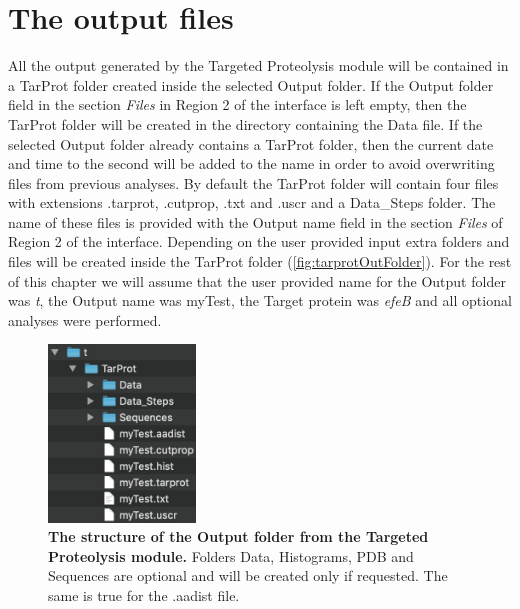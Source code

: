 \section{The output files}

All the output generated by the Targeted Proteolysis module will be contained in a TarProt folder created inside the selected Output folder. If the Output folder field in the section \textit{Files} in Region \num{2} of the interface is left empty, then the TarProt folder will be created in the directory containing the Data file. If the selected Output folder already contains a TarProt folder, then the current date and time to the second will be added to the name in order to avoid overwriting files from previous analyses. By default the TarProt folder will contain four files with extensions .tarprot, .cutprop, .txt and .uscr and a Data{\_}Steps folder. The name of these files is provided with the Output name field in the section \textit{Files} of Region \num{2} of the interface. Depending on the user provided input extra folders and files will be created inside the TarProt folder (\autoref{fig:tarprotOutFolder}). For the rest of this chapter we will assume that the user provided name for the Output folder was \textit{t}, the Output name was myTest, the Target protein was \textit{efeB} and all optional analyses were performed.

\begin{figure}[h]
	\centering
	\includegraphics[width=0.35\textwidth]{./IMAGES/MOD-TARPROT/tarprot-files.jpg}	    
	\caption[The structure of the Output folder from the Targeted Proteolysis module]{\textbf{The structure of the Output folder from the Targeted Proteolysis module.} Folders Data, Histograms, PDB and Sequences are optional and will be created only if requested. The same is true for the .aadist file.} 
	\label{fig:tarprotOutFolder}
	\vspace{-5pt} 	
\end{figure} 

